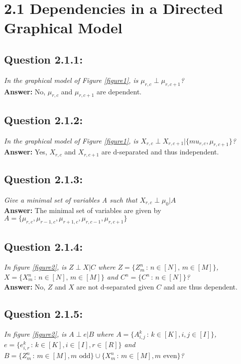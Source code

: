 \section*{2.1 Dependencies in a Directed Graphical Model}

\subsection*{Question 2.1.1:}
\textit{In the graphical model of Figure \ref{figure1}, is $\mu_{r,c} \perp \mu_{r,c+1}$?}
\\

\textbf{Answer:} No, $\mu_{r,c}$ and $\mu_{r,c+1}$ are dependent.

\subsection*{Question 2.1.2:}
\textit{In the graphical model of Figure \ref{figure1}, is $X_{r,c} \perp X_{r,c+1} | \{mu_{r,c}, \mu_{r,c+1} \}$?}
\\

\textbf{Answer:} Yes, $X_{r,c}$ and $X_{r,c+1}$ are d-separated and thus independent.

\subsection*{Question 2.1.3:}
\textit{Give a minimal set of variables A such that $X_{r,c} \perp \mu_0 | A$}
\\

\textbf{Answer:} The minimal set of variables are given by$A = \{ \mu_{r,c}, \mu_{r-1,c}, \mu_{r+1,c}, \mu_{r,c-1}, \mu_{r,c+1} \}$

\subsection*{Question 2.1.4:}
\textit{In figure \ref{figure2}, is $Z \perp X | C$ where $Z = \{ Z_m^n \, : \, n \in [N], \, m \in [M] \}$, $X = \{ X_m^n \, : \, n \in [N], \, m \in [M] \}$ and $C^n = \{ C^n \, : \, n \in [N] \} $? }
\\

\textbf{Answer:} No, $Z$ and $X$ are not d-separated given $C$ and are thus dependent.

\subsection*{Question 2.1.5:}
\textit{In figure \ref{figure2}, is $A \perp e | B$ where $A = \{ A^k_{i,j} \, : \, k \in [K], i,j \in [I] \} $, $e = \{e^k_{i,r} \, : \, k \in [K], i \in [I], r \in [R] \}$ and $B = \{ Z_m^n \, : \, m \in [M], m \text{ odd} \} \cup \{ X_m^n \, : \, m \in [M], m \text{ even} \}$? }

